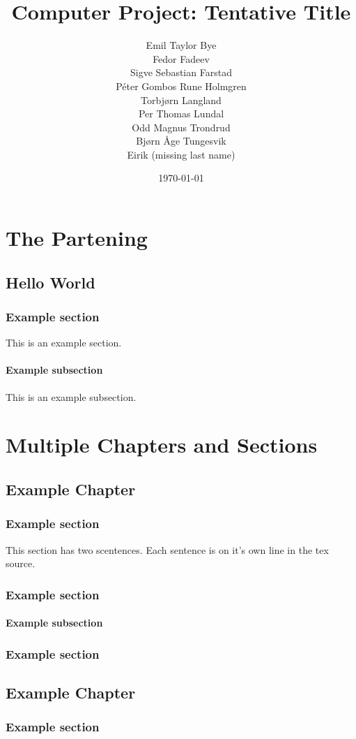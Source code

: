 \documentclass{report}
\title{Computer Project: Tentative Title}
\date{\today}
\author{Emil Taylor Bye
     \\ Fedor Fadeev
     \\ Sigve Sebastian Farstad
     \\ Péter Gombos Rune Holmgren
     \\ Torbjørn Langland
     \\ Per Thomas Lundal
     \\ Odd Magnus Trondrud
     \\ Bjørn Åge Tungesvik
     \\ Eirik (missing last name)
}
\begin{document}
\maketitle

\tableofcontents

\part{The Partening}

\chapter{Hello World}

\section{Example section}

This is an example section.

\subsection{Example subsection}

This is an example subsection.

\part{Multiple Chapters and Sections}

\chapter{Example Chapter}

\section{Example section}

This section has two scentences.
Each sentence is on it's own line in the tex source.

\section{Example section}

\subsection{Example subsection}

\section{Example section}

\chapter{Example Chapter}

\section{Example section}
\end{document}
